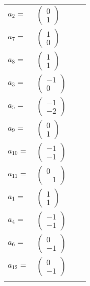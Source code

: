\documentclass[1p]{elsarticle_modified}
\theoremstyle{definition}
\begin{document}
\begin{tabular}{m{7pt} m{180pt} m{7pt} m{180pt} }
\flushright $a_{2}=$&$\begin{pmatrix}0\\1\end{pmatrix}$ \\
\flushright $a_{7}=$&$\begin{pmatrix}1\\0\end{pmatrix}$ \\
\flushright $a_{8}=$&$\begin{pmatrix}1\\1\end{pmatrix}$ \\
\flushright $a_{3}=$&$\begin{pmatrix}-1\\0\end{pmatrix}$ \\
\flushright $a_{5}=$&$\begin{pmatrix}-1\\-2\end{pmatrix}$ \\
\flushright $a_{9}=$&$\begin{pmatrix}0\\1\end{pmatrix}$ \\
\flushright $a_{10}=$&$\begin{pmatrix}-1\\-1\end{pmatrix}$ \\
\flushright $a_{11}=$&$\begin{pmatrix}0\\-1\end{pmatrix}$ \\
\flushright $a_{1}=$&$\begin{pmatrix}1\\1\end{pmatrix}$ \\
\flushright $a_{4}=$&$\begin{pmatrix}-1\\-1\end{pmatrix}$ \\
\flushright $a_{6}=$&$\begin{pmatrix}0\\-1\end{pmatrix}$ \\
\flushright $a_{12}=$&$\begin{pmatrix}0\\-1\end{pmatrix}$\\&\end{tabular}
\end{document}
